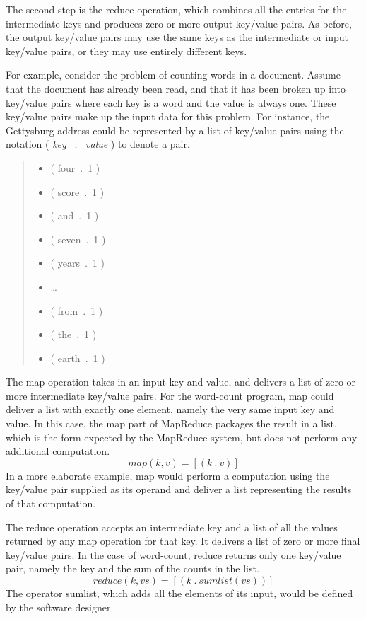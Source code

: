 The second step is the \textsf{reduce} 
operation, which combines all the entries 
for the intermediate keys and
produces zero or more output key/value pairs.  As before, the
output key/value pairs may use the same keys as the
intermediate or input key/value pairs, or they may use
entirely different keys.

For example, consider the problem of counting words in a
document.  Assume that the document has already been
read, and that it has been broken up into key/value pairs
where each key is a word and the value is always one. These
key/value pairs make up the input data for this problem. For
instance, the Gettysburg address could be represented by a
list of key/value pairs using the notation ( \emph{key} ~.~ \emph{value} )
to denote a pair.
\begin{quote}
\begin{itemize}
\item \textsf{( four~.~1 )}
\item \textsf{( score~.~1 )}
\item \textsf{( and~.~1 )}
\item \textsf{( seven~.~1 )}
\item \textsf{( years~.~1 )}
\item \dots
\item \textsf{( from~.~1 )}
\item \textsf{( the~.~1 )}
\item \textsf{( earth~.~1 )}
\end{itemize}
\end{quote}

The map operation takes in an input key and
value, and delivers a list of zero or more intermediate
key/value pairs.  For the word-count program, map could
deliver a list with exactly one element, namely
the very same input key and value.
In this case, the map part of MapReduce
packages the result in a list, which is
the form expected by the MapReduce system,
but does not perform any additional computation.
\begin{displaymath}
map(k, v) = [ ( k ~.~ v ) ]
\end{displaymath}
In a more elaborate example, map would perform
a computation using the key/value pair supplied as
its operand and deliver a list representing the results
of that computation.

The reduce operation accepts an intermediate key and a list of
all the values returned by any map operation for that key.
It delivers a list of zero or more final key/value pairs.
In the case of word-count, reduce returns only one key/value pair,
namely the key and the sum of the counts in the list.
\begin{displaymath}
reduce(k, vs) = [ ( k ~.~ sumlist(vs) ) ]
\end{displaymath}
The operator sumlist, which adds all the elements of its
input, would be defined by the software designer.

